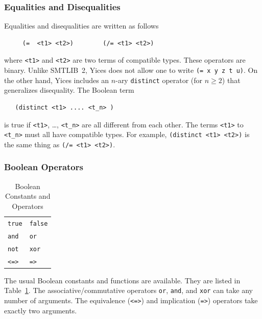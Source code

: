 \documentclass[11pt,twoside,fleqn,openright,titlepage]{cslreport}
\begin{document}
\subsubsection*{Equalities and Disequalities}

Equalities and disequalities are written as follows
\begin{small}
\begin{verbatim}
     (=  <t1> <t2>)        (/= <t1> <t2>)
\end{verbatim}
\end{small}
where \texttt{<t1>} and \texttt{<t2>} are two terms of compatible
types. These operators are binary. Unlike SMTLIB~2, Yices does not
allow one to write \texttt{(= x y z t u)}. On the other hand, Yices
includes an $n$-ary \texttt{distinct} operator (for $n\geq 2$) that
generalizes disequality. The Boolean term
\begin{small}
\begin{verbatim}
   (distinct <t1> .... <t_n> )
\end{verbatim}
\end{small}
is true if \texttt{<t1>}, \ldots, \texttt{<t\_n>} are all different
from each other. The terms \texttt{<t1>} to \texttt{<t\_n>} must all
have compatible types. For example, \texttt{(distinct <t1> <t2>)} is
the same thing as \texttt{(/= <t1> <t2>)}.

\subsubsection*{Boolean Operators}

\begin{table}[h]
\begin{small}
\begin{center}
\begin{tabular}{|p{2cm}|p{2cm}|}
\hline
\texttt{true} & \texttt{false} \\
\texttt{and} & \texttt{or}  \\
\texttt{not} & \texttt{xor}  \\
\texttt{<=>} & \texttt{=>}  \\
\hline
\end{tabular}
\end{center}
\end{small}
\caption{Boolean Constants and Operators}
\label{Boolean-Operators}
\end{table}

\noindent
The usual Boolean constants and functions are available. They are
listed in Table~\ref{Boolean-Operators}.  The associative/commutative
operators \texttt{or}, \texttt{and}, and \texttt{xor} can take any
number of arguments. The equivalence (\texttt{<=>}) and implication
(\texttt{=>}) operators take exactly two arguments.
\end{document}
